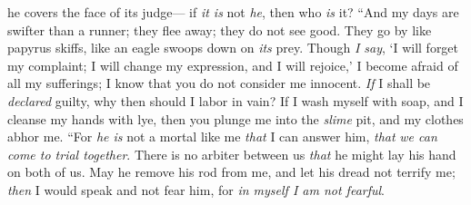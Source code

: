 \begin{biblechapter}
he covers the face of its judge— 
if \textit{it is} not \textit{he}, then who \textit{is} it?
\verse “And my days are swifter than a runner; 
they flee away; they do not see good.
\verse They go by like papyrus skiffs, 
like an eagle swoops down on \textit{its} prey.
\verse Though \textit{I say}, ‘I will forget my complaint; 
I will change my expression, and I will rejoice,’
\verse I become afraid of all my sufferings; 
I know that you do not consider me innocent.
\verse \textit{If} I shall be \textit{declared} guilty, 
why then should I labor in vain?
\verse If I wash myself with soap, 
and I cleanse my hands with lye,
\verse then you plunge me into the \textit{slime} pit, 
and my clothes abhor me.
\verse “For \textit{he is} not a mortal like me \textit{that} I can answer him, 
\textit{that} \textit{we can come to trial together}.
\verse There is no arbiter between us 
\textit{that} he might lay his hand on both of us.
\verse May he remove his rod from me, 
and let his dread not terrify me;
\verse \textit{then} I would speak and not fear him, 
for \textit{in myself I am not fearful}.
\end{biblechapter}

